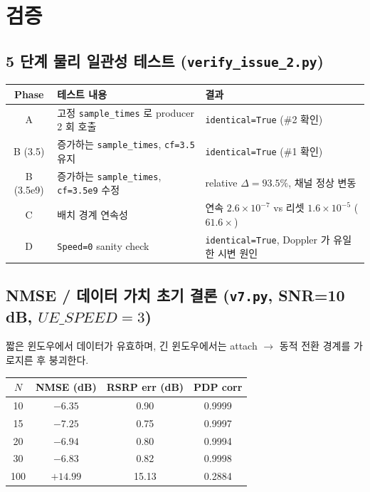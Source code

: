 \documentclass[11pt,a4paper]{article}
\newcommand{\vseven}{\texttt{v7.py}}
\begin{document}
\section{검증}
\label{sec:verify}

\subsection{5 단계 물리 일관성 테스트 (\texttt{verify\_issue\_2.py})}

\begin{center}
\renewcommand{\arraystretch}{1.25}
\begin{tabular}{c p{6.6cm} l}
\toprule
\textbf{Phase} & \textbf{테스트 내용} & \textbf{결과} \\
\midrule
A          & 고정 \texttt{sample\_times} 로 producer 2 회 호출
           & \texttt{identical=True} (\#2 확인) \\
B (3.5)    & 증가하는 \texttt{sample\_times}, \texttt{cf=3.5} 유지
           & \texttt{identical=True} (\#1 확인) \\
B (3.5e9)  & 증가하는 \texttt{sample\_times}, \texttt{cf=3.5e9} 수정
           & relative $\Delta=93.5\%$, 채널 정상 변동 \\
C          & 배치 경계 연속성
           & 연속 $2.6\times10^{-7}$ vs 리셋 $1.6\times10^{-5}$ ($61.6\times$) \\
D          & \texttt{Speed=0} sanity check
           & \texttt{identical=True}, Doppler 가 유일한 시변 원인 \\
\bottomrule
\end{tabular}
\end{center}

\subsection{NMSE / 데이터 가치 초기 결론 (\vseven{}, SNR=10\,dB, $UE\_SPEED=3$)}

짧은 윈도우에서 데이터가 유효하며, 긴 윈도우에서는 attach $\to$ 동적 전환
경계를 가로지른 후 붕괴한다.

\begin{center}
\renewcommand{\arraystretch}{1.20}
\begin{tabular}{c c c c}
\toprule
$N$ & NMSE (dB) & RSRP err (dB) & PDP corr \\
\midrule
10  & $-6.35$  & 0.90  & 0.9999 \\
15  & $-7.25$  & 0.75  & 0.9997 \\
20  & $-6.94$  & 0.80  & 0.9994 \\
30  & $-6.83$  & 0.82  & 0.9998 \\
100 & $+14.99$ & 15.13 & 0.2884 \\
\bottomrule
\end{tabular}
\end{center}
\end{document}
